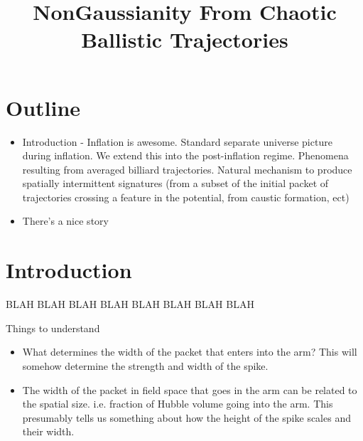 \documentclass[11pt,a4paper]{article}
\begin{document}
\title{NonGaussianity From Chaotic Ballistic Trajectories}

\maketitle

\section{Outline}
\begin{itemize}
\item Introduction - Inflation is awesome.  Standard separate universe picture during inflation.  We extend this into the post-inflation regime.  Phenomena resulting from averaged billiard trajectories.  Natural mechanism to produce spatially intermittent signatures (from a subset of the initial packet of trajectories crossing a feature in the potential, from caustic formation, ect)
\item There's a nice story 
\end{itemize}

\section{Introduction}
BLAH BLAH BLAH BLAH BLAH BLAH BLAH BLAH








Things to understand
\begin{itemize}
\item What determines the width of the packet that enters into the arm?  This will somehow determine the strength and width of the spike.
\item The width of the packet in field space that goes in the arm can be related to the spatial size.  i.e. fraction of Hubble volume going into the arm.  This presumably tells us something about how the height of the spike scales and their width.
\end{itemize}
\end{document}
